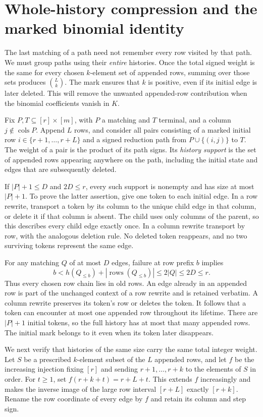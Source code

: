 \documentclass[11pt,a4paper,oneside,openany]{book}
\theoremstyle{definition}\newtheorem{definition}[theorem]{Definition}
\theoremstyle{remark}\newtheorem{remark}[theorem]{Remark}
\numberwithin{equation}{chapter}
\begin{document}
\section{Whole-history compression and the marked binomial identity}
The last matching of a path need not remember every row visited by
that path. We must group paths using their \emph{entire} histories.
Once the total signed weight is the same for every chosen $k$-element set
of appended rows, summing over those sets produces $\binom{L}{k}$.
The mark ensures that $k$ is positive, even if its initial edge is
later deleted. This will remove the unwanted appended-row contribution
when the binomial coefficients vanish in $K$.


Fix $P,T\subseteq[r]\times[m]$, with $P$ a matching and $T$ terminal, and a column
$j\notin\operatorname{cols}P$.  Append $L$ rows, and consider all pairs
consisting of a marked initial row $i\in\{r+1,\ldots,r+L\}$ and a signed
reduction path from $P\cup\{(i,j)\}$ to $T$.  The weight of a pair is the
product of its path signs.  Its \emph{history support} is the set of
appended rows appearing anywhere on the path, including the initial
state and edges that are subsequently deleted.

If $|P|+1\leq D$ and $2D\leq r$, every such support is nonempty and has
size at most $|P|+1$.  To prove the latter assertion, give one token to
each initial edge.  In a row rewrite, transport a token by its column
to the unique child edge in that column, or delete it if that column
is absent.  The child uses only columns of the parent, so this describes
every child edge exactly once.  In a column rewrite transport by row,
with the analogous deletion rule.  No deleted token reappears, and no
two surviving tokens represent the same edge.

For any matching $Q$ of at most $D$ edges, failure at row prefix $b$
implies
\[
 b< h(Q_{\leq b})+
       |\operatorname{rows}(Q_{\leq b})|\leq 2|Q|\leq2D\leq r.
\]
Thus every chosen row chain lies in old rows.  An edge already in an
appended row is part of the unchanged context of a row rewrite and is
retained verbatim.  A column rewrite preserves its token's row or
deletes the token.  It follows that a token can encounter at most one
appended row throughout its lifetime.  There are $|P|+1$ initial tokens,
so the full history has at most that many appended rows.  The initial
mark belongs to it even when its token later disappears.

We next verify that histories of the same size carry the same total
integer weight.  Let $S$ be a prescribed $k$-element subset of the $L$
appended rows, and let $f$ be the increasing injection fixing $[r]$ and
sending $r+1,\ldots,r+k$ to the elements of $S$ in order.  For $t\geq1$, set $f(r+k+t)=r+L+t$.
This extends $f$ increasingly and makes the inverse image of the large
row interval $[r+L]$ exactly $[r+k]$.  Rename the row coordinate of every
edge by $f$ and retain its column and step sign.
\end{document}
